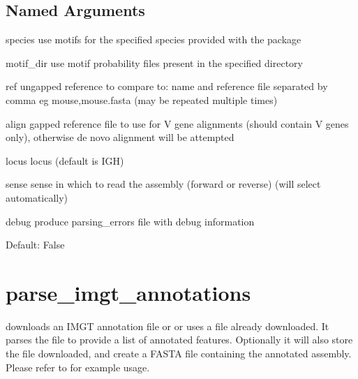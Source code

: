 \documentclass[letterpaper,10pt,english]{sphinxmanual}
\begin{document}
\subsection{Named Arguments}
\label{\detokenize{tools/find_alignments:named-arguments}}\begin{optionlist}{3cm}
\item [\sphinxhyphen{}species]  
\sphinxAtStartPar
use motifs for the specified species provided with the package
\item [\sphinxhyphen{}motif\_dir]  
\sphinxAtStartPar
use motif probability files present in the specified directory
\item [\sphinxhyphen{}ref]  
\sphinxAtStartPar
ungapped reference to compare to: name and reference file separated by comma eg mouse,mouse.fasta (may be repeated multiple times)
\item [\sphinxhyphen{}align]  
\sphinxAtStartPar
gapped reference file to use for V gene alignments (should contain V genes only), otherwise de novo alignment will be attempted
\item [\sphinxhyphen{}locus]  
\sphinxAtStartPar
locus (default is IGH)
\item [\sphinxhyphen{}sense]  
\sphinxAtStartPar
sense in which to read the assembly (forward or reverse) (will select automatically)
\item [\sphinxhyphen{}debug]  
\sphinxAtStartPar
produce parsing\_errors file with debug information

\sphinxAtStartPar
Default: False
\end{optionlist}

\sphinxstepscope


\section{parse\_imgt\_annotations}
\label{\detokenize{tools/parse_imgt_annotations:parse-imgt-annotations}}\label{\detokenize{tools/parse_imgt_annotations:id1}}\label{\detokenize{tools/parse_imgt_annotations::doc}}
\sphinxAtStartPar
{} downloads an IMGT annotation file or or uses a file already downloaded. It parses the file to provide a list of annotated features.
Optionally it will also store the file downloaded, and create a FASTA file containing the annotated assembly.
Please refer to {\hyperref[\detokenize{examples/human_igh:human-igh}]{}} for example usage.
\end{document}
